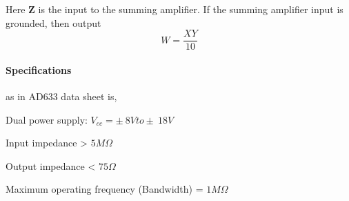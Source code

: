 Here $\textbf{Z}$ is the input to the summing amplifier. If the summing amplifier input is grounded, then output 
\begin{equation}
W=\frac{XY}{10}
\end{equation}

\paragraph{Specifications}as in AD633 data sheet is,

\noindent Dual power supply: $V_{cc}= \pm \ 8V to \pm \ 18V$

\noindent Input impedance > $5 M \Omega$

\noindent Output impedance < $75  \Omega$

\noindent Maximum operating frequency (Bandwidth) = $1 M\Omega$

